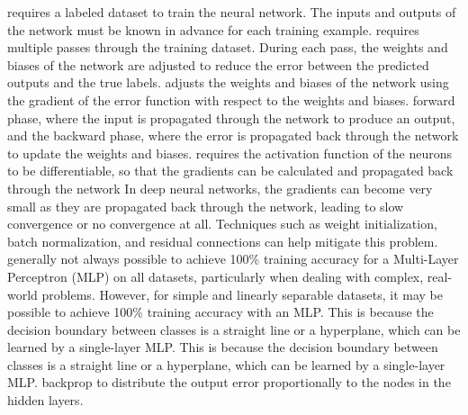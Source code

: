 \documentclass[10pt]{article}
\begin{document}
\smallbreak
{}
\NEW    [supervised] requires a labeled dataset to train the neural network. The inputs and outputs of the network must be known
in advance for each training example.
\NEW    [iterative] requires multiple passes through the training dataset. During each pass, the weights and biases of the network are adjusted to reduce the error between the predicted outputs and the true labels.
 adjusts the weights and biases of the network using the gradient of the error function with respect to the weights and biases.
\NEW    [2 phases] forward phase, where the input is propagated through the network to produce an output, and the backward phase, where the error is propagated back through the network to update the weights and biases.
 requires the activation function of the neurons to be differentiable, so that the gradients can be calculated and propagated back through the network
 In deep neural networks, the gradients can become very small as they are propagated back through the network, leading to slow convergence or no convergence at all. Techniques such as weight initialization, batch normalization, and residual connections can help mitigate this problem.
 generally not always possible to achieve 100\% training accuracy for a Multi-Layer Perceptron (MLP) on all datasets, particularly when dealing with complex, real-world problems. However, for simple and linearly separable datasets, it may be possible to achieve 100\% training accuracy with an MLP. This is because the decision boundary between classes is a straight line or a hyperplane, which can be learned by a single-layer MLP. This is because the decision boundary between classes is a straight line or a hyperplane, which can be learned by a single-layer MLP.
\NEW backprop to distribute the output error proportionally to the nodes in the hidden layers.
\end{document}
